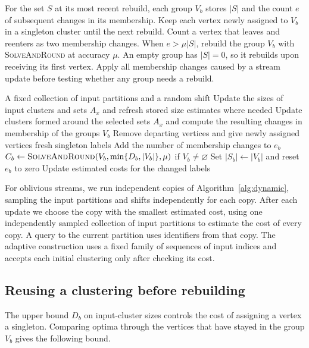 \documentclass[11pt]{article}
\newcommand{\BandSeed}{\textup{\textsc{SolveAndRound}}}
\begin{document}
For the set $S$ at its most recent rebuild, each group $V_b$ stores $|S|$
and the count $e$ of subsequent changes in its membership. Keep each vertex newly assigned to $V_b$ in a singleton cluster until
the next rebuild. Count a vertex that leaves and reenters as two membership changes. When $e>\mu|S|$, rebuild
the group $V_b$ with \BandSeed{} at accuracy $\mu$. An empty group has $|S|=0$, so it
rebuilds upon receiving its first vertex. Apply all membership changes caused by a stream
update before testing
whether any group needs a rebuild.

\begin{algorithm}[htbp]
\caption{Maintaining one trial under vertex updates}
\label{alg:dynamic}
\begin{algorithmic}[1]
\Require A fixed collection of input partitions and a random shift
    \State Update the sizes of input clusters and sets $A_x$ and refresh stored size estimates where needed
    \State Update clusters formed around the selected sets $A_x$ and compute the resulting changes in membership of the groups $V_b$
        \State Remove departing vertices and give newly assigned vertices fresh singleton labels
        \State Add the number of membership changes to $e_b$
            \State $C_b\gets\BandSeed(V_b,\min\{D_b,|V_b|\},\mu)$ if $V_b\ne\varnothing$
            \State Set $|S_b|\gets |V_b|$ and reset $e_b$ to zero
        \EndIf
    \EndFor
    \State Update estimated costs for the changed labels
\EndFor
\end{algorithmic}
\end{algorithm}

For oblivious streams, we run independent copies of
Algorithm~\ref{alg:dynamic}, sampling the input partitions and shifts independently for each copy.
After each update we choose the copy with the smallest estimated cost, using one
independently sampled collection
of input partitions to estimate the cost of every copy. A query to the current partition
uses identifiers from that copy.
The adaptive construction uses a fixed family of sequences of input indices and accepts
each initial clustering only after checking its cost.

\subsection{Reusing a clustering before rebuilding}

The upper bound $D_b$ on input-cluster sizes controls the cost of assigning a vertex
a singleton. Comparing optima through the vertices that have
stayed in the group $V_b$ gives the following bound.
\end{document}
